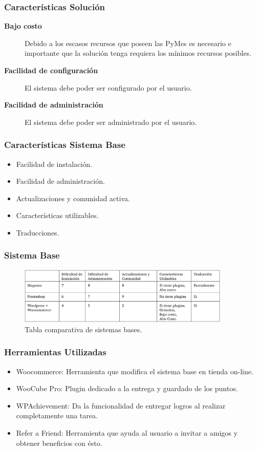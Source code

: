 \documentclass[10pt, compress]{beamer}
\begin{document}
\begin{frame}
 \frametitle{Características Solución}
\begin{description}
 \item[\textbf{Bajo costo}] Debido a los escasos recursos que poseen las PyMes es necesario e importante que
la solución tenga requiera los mínimos recursos posibles.
 \item[\textbf{Facilidad de configuración}] El sistema debe poder ser configurado por el usuario.
 \item[\textbf{Facilidad de administración}] El sistema debe poder ser administrado por el usuario.
\end{description}
\end{frame}

\begin{frame}
 \frametitle{Características Sistema Base}

\begin{itemize}[<+- | alert@+>]
 \item Facilidad de instalación.
 \item Facilidad de administración.
 \item Actualizaciones y comunidad activa.
 \item Características utilizables.
 \item Traducciones.
\end{itemize}
\end{frame}

\begin{frame}
 \frametitle{Sistema Base}

\begin{figure}
\centering
    \includegraphics[width=0.9\textwidth]{images/tablaWord.png}
    \caption{Tabla comparativa de sistemas bases.}
    \label{fig:awesome_image}
\end{figure}

\end{frame}

\begin{frame}
 \frametitle{Herramientas Utilizadas}

\begin{itemize}[<+- | alert@+>]
 \item Woocommerce: Herramienta que modifica el sistema base en tienda on-line.
 \item WooCube Pro: Plugin dedicado a la entrega y guardado de los puntos.
 \item WPAchievement: Da la funcionalidad de entregar logros al realizar completamente una tarea.
 \item Refer a Friend: Herramienta que ayuda al usuario a invitar a amigos y obtener beneficios con ésto.
\end{itemize}
\end{frame}
\end{document}
